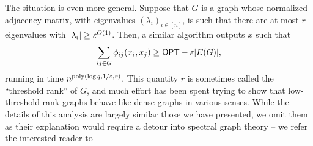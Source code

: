 \documentclass{article}
\begin{document}
The situation is even more general. Suppose that $G$ is a graph whose normalized adjacency matrix, with eigenvalues $(\lambda_i)_{i \in [n]}$, is such that there are at most $r$ eigenvalues with $|\lambda_i| \ge \varepsilon^{O(1)}$. Then, a similar algorithm outputs $x$ such that
\[ \sum_{ij \in G} \phi_{ij}(x_i,x_j) \ge \mathsf{OPT} - \varepsilon |E(G)|, \]
running in time $n^{\operatorname{poly}(\log q,1/\varepsilon,r)}$. This quantity $r$ is sometimes called the ``threshold rank'' of $G$, and much effort has been spent trying to show that low-threshold rank graphs behave like dense graphs in various senses. While the details of this analysis are largely similar those we have presented, we omit them as their explanation would require a detour into spectral graph theory -- we refer the interested reader to 



\end{document}
